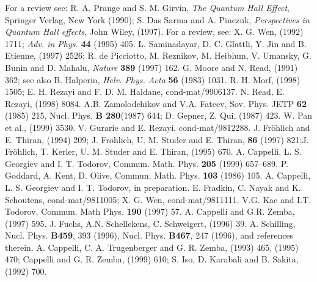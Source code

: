 \documentclass[a4paper,12pt]{article}
\begin{document}
\begin{thebibliography}{999}
 For a review see: R. A. Prange and S. M. Girvin, 
                {\it The Quantum Hall Effect}, Springer Verlag, New York 
                (1990); S. Das Sarma and A. Pinczuk, {\it Perspectives 
                in Quantum Hall effects}, John Wiley, (1997).
   For a review, see: X. G. Wen,  (1992) 1711; 
                {\it Adv. in Phys.} {\bf 44} (1995) 405.
  L. Saminadayar, D. C. Glattli, Y. Jin and
                B. Etienne,  (1997) 2526;
                R. de Picciotto, M. Reznikov, M. Heiblum, V. Umansky,
                G. Bunin and D. Mahalu, {\it Nature} {\bf 389} (1997) 162.
  G. Moore and N. Read,  (1991) 362;
                see also B. Halperin, {\it Helv. Phys. Acta} {\bf 56}
                (1983) 1031.
 R. H. Morf,  (1998) 1505; E. H. Rezayi and 
                F. D. M. Haldane, cond-mat/9906137.
   N. Read, E. Rezayi,  (1998) 8084.
  A.B. Zamolodchikov and V.A. Fateev,  Sov. Phys. JETP 
              {\bf 62} (1985) 215, Nucl. Phys. {\bf B 280}(1987) 644;
              D. Gepner, Z. Qui,  (1987) 423.
 W. Pan et al.,  (1999) 3530.
 V. Gurarie and E. Rezayi, cond-mat/9812288.
  J. Fr\"{o}hlich and E. Thiran,  (1994) 209;
               J. Fr\"{o}hlich, U. M. Studer and E. Thiran, \JSP
               {\bf 86} (1997) 821;J. Fr\"{o}hlich, T. Kerler,
                U. M. Studer and E. Thiran,  (1995) 670.
 A. Cappelli, L. S. Georgiev and I. T. Todorov,
               Commun. Math. Phys. {\bf 205} (1999) 657--689.
 P. Goddard, A. Kent,  D. Olive, Commun. Math. Phys.
              {\bf 103} (1986) 105.
 A. Cappelli, L. S. Georgiev and I. T. Todorov,
               in preparation.
 E. Fradkin, C. Nayak and K. Schoutens, cond-mat/9811005;
               X. G. Wen, cond-mat/9811111. 
 V.G. Kac and I.T. Todorov, Commun. Math Phys. {\bf 190} 
              (1997) 57.
  A. Cappelli and G.R. Zemba,  (1997) 595.
 J. Fuchs, A.N. Schellekens, C. Schweigert,
               (1996) 39.
 A. Schilling, {Nucl. Phys.} {\bf B459}, 393 (1996),
              {Nucl. Phys.} {\bf B467}, 247 (1996), and references therein.
  A. Cappelli, C. A. Trugenberger and G. R. Zemba,
                (1993) 465,  (1995) 470; 
               Cappelli and G. R. Zemba,  (1999) 610;
               S. Iso, D. Karabali and B. Sakita,  (1992) 700.
\end{thebibliography}
\end{document}

